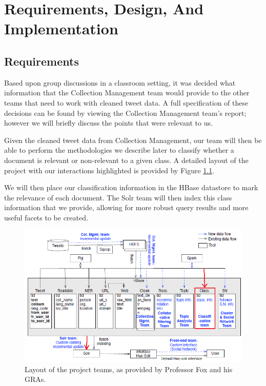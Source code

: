 \chapter[Requirements, Design, and Implementation]{Requirements, Design, And\\ Implementation}\label{ch:ReqDesignImp}
\section{Requirements}
Based upon group discussions in a classroom setting, it was decided what information that the Collection Management team would provide to the other teams that need to work with cleaned tweet data. A full specification of these decisions can be found by viewing the Collection Management team's report; however we will briefly discuss the points that were relevant to us.

Given the cleaned tweet data from Collection Management, our team will then be able to perform the methodologies we describe later to classify whether a document is relevant or non-relevant to a given class. A detailed layout of the project with our interactions highlighted is provided by Figure \ref{fig:design}.

We will then place our classification information in the HBase datastore to mark the relevance of each document. The Solr team will then index this class information that we provide, allowing for more robust query results and more useful facets to be created.

\begin{figure}[ht]
	\centering
	\includegraphics[width=\textwidth]{figures/data_flow.png}
    \caption{Layout of the project teams, as provided by Professor Fox and his GRAs.}\label{fig:design}
\end{figure}

